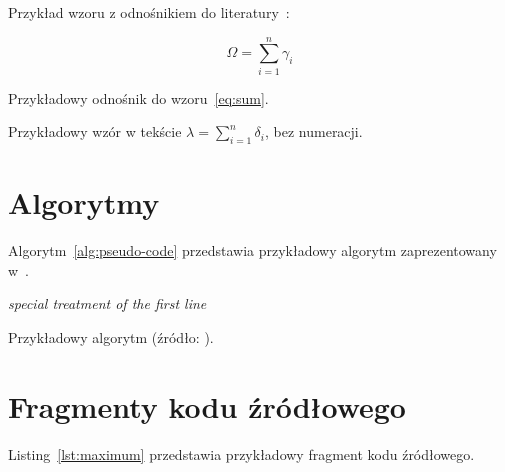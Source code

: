 \documentclass[polish]{aghengthesis}
\begin{document}
Przykład wzoru z odnośnikiem do literatury~\cite{author2021title}:

\begin{equation}
\Omega = \sum_{i=1}^n \gamma_i
\label{eq:sum}
\end{equation}

Przykładowy odnośnik do wzoru~\eqref{eq:sum}.

Przykładowy wzór w tekście $\lambda = \sum_{i=1}^n \delta_i$, bez numeracji.

\section{Algorytmy}
\label{sec:algorytmy}

Algorytm~\ref{alg:pseudo-code} przedstawia przykładowy algorytm zaprezentowany w~\cite{fiorio2017algorithm2e}. 

\begin{algorithm}[!htbp]
\BlankLine
\emph{special treatment of the first line}\;
  \caption[Przykładowy algorytm]{Przykładowy algorytm (źródło: \cite{fiorio2017algorithm2e}).}
  \label{alg:pseudo-code}
\end{algorithm}

\section{Fragmenty kodu źródłowego}
\label{sec:listingi}
Listing~\ref{lst:maximum} przedstawia przykładowy fragment kodu źródłowego.
\end{document}
